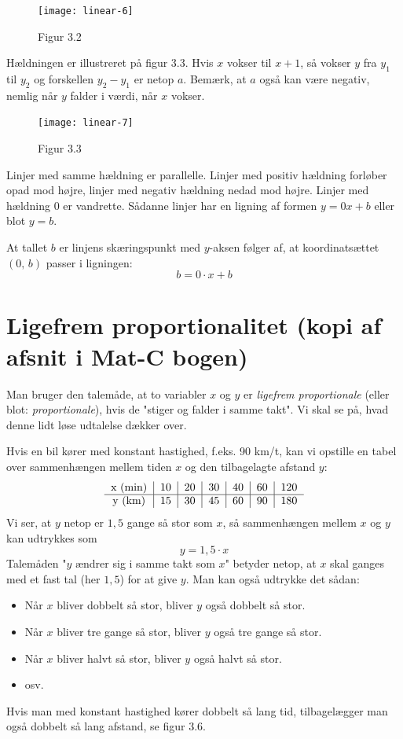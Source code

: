 \documentclass[12pt,oneside,a4paper]{article}
\begin{document}
\begin{figure}[ht]
    \centering
    \texttt{[image: linear-6]}
    \caption{Figur 3.2}
    \label{fig32}
\end{figure}

Hældningen er illustreret på figur 3.3. Hvis $x$ vokser til $x+1$, så vokser
$y$ fra $y_1$ til $y_2$ og forskellen $y_2-y_1$ er netop $a$. Bemærk, at $a$
også kan være negativ, nemlig når $y$ falder i værdi, når $x$ vokser.

\begin{figure}[ht]
    \centering
    \texttt{[image: linear-7]}
    \caption{Figur 3.3}
    \label{fig33}
\end{figure}

Linjer med samme hældning er parallelle. Linjer med positiv hældning forløber
opad mod højre, linjer med negativ hældning nedad mod højre. Linjer med
hældning 0 er vandrette.  Sådanne linjer har en ligning af formen $y=0x+b$
eller blot $y=b$.

At tallet $b$ er linjens skæringspunkt med $y$-aksen følger af, at
koordinatsættet $(0,\,b)$ passer i ligningen:
$$
b = 0\cdot x+b
$$

\section{Ligefrem proportionalitet (kopi af afsnit i Mat-C bogen)}
Man bruger den talemåde, at to variabler $x$ og $y$ er {\em ligefrem
proportionale} (eller blot: {\em proportionale}), hvis de "stiger og falder i
samme takt". Vi skal se på, hvad denne lidt løse udtalelse dækker over.

Hvis en bil kører med konstant hastighed, f.eks. 90 km/t, kan vi opstille en
tabel over sammenhængen mellem tiden $x$ og den tilbagelagte afstand $y$:
$$
\begin{tabular}{c|c|c|c|c|c|c}
    x ({\rm min}) & 10 & 20 & 30 & 40 & 60 & 120 \\
    \hline
    y ({\rm km})  & 15 & 30 & 45 & 60 & 90 & 180  
\end{tabular}
$$
Vi ser, at $y$ netop er $1,5$ gange så stor som $x$, så sammenhængen mellem $x$
og $y$ kan udtrykkes som
$$
y = 1,5\cdot x
$$
Talemåden "$y$ ændrer sig i samme takt som $x$" betyder netop, at $x$ skal
ganges med et fast tal (her $1,5$) for at give $y$. Man kan også udtrykke det
sådan:
\begin{itemize}
    \item Når $x$ bliver dobbelt så stor, bliver $y$ også dobbelt så stor.
    \item Når $x$ bliver tre gange så stor, bliver $y$ også tre gange så stor.
    \item Når $x$ bliver halvt så stor, bliver $y$ også halvt så stor.
    \item osv.
\end{itemize}
Hvis man med konstant hastighed kører dobbelt så lang tid, tilbagelægger man
også dobbelt så lang afstand, se figur 3.6.
\end{document}
